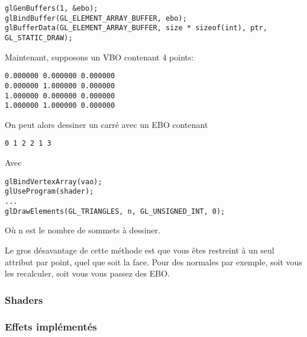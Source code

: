 \documentclass[11pt, a4paper, titlepage]{article}
\begin{document}
\begin{lstlisting}
glGenBuffers(1, &ebo);
glBindBuffer(GL_ELEMENT_ARRAY_BUFFER, ebo);
glBufferData(GL_ELEMENT_ARRAY_BUFFER, size * sizeof(int), ptr, GL_STATIC_DRAW);
\end{lstlisting}

Maintenant, supposons un VBO contenant 4 points:
\begin{verbatim}
0.000000 0.000000 0.000000
0.000000 1.000000 0.000000
1.000000 0.000000 0.000000
1.000000 1.000000 0.000000
\end{verbatim}

On peut alors dessiner un carré avec un EBO contenant

\begin{verbatim}
0 1 2 2 1 3
\end{verbatim}

Avec
\begin{lstlisting}
glBindVertexArray(vao);
glUseProgram(shader);
...
glDrawElements(GL_TRIANGLES, n, GL_UNSIGNED_INT, 0);
\end{lstlisting}

Où n est le nombre de sommets à dessiner.

Le gros désavantage de cette méthode est que vous êtes restreint à un seul attribut par point, quel que soit la face. Pour des normales par exemple, 
soit vous les recalculer, soit vous vous passez des EBO.

\subsubsection{Shaders}

\subsubsection{Effets implémentés}
\end{document}
